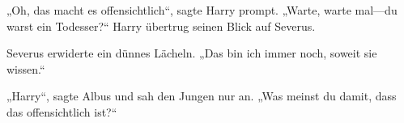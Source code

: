 „Oh, das macht es offensichtlich“, sagte Harry prompt. „Warte, warte mal—du warst ein Todesser?“ Harry übertrug seinen Blick auf Severus.

Severus erwiderte ein dünnes Lächeln. „Das bin ich immer noch, soweit sie wissen.“

„Harry“, sagte Albus und sah den Jungen nur an. „Was meinst du damit, dass das offensichtlich ist?“

